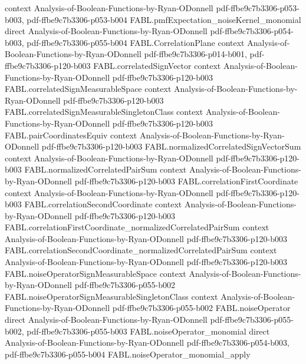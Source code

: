 \begin{theorem}
  {context}
  {Analysis-of-Boolean-Functions-by-Ryan-ODonnell}
  {pdf-ffbe9c7b3306-p053-b003,
    pdf-ffbe9c7b3306-p053-b004}
\proofstep
  {FABL.pmfExpectation_noiseKernel_monomial}
  {direct}
  {Analysis-of-Boolean-Functions-by-Ryan-ODonnell}
  {pdf-ffbe9c7b3306-p054-b003,
    pdf-ffbe9c7b3306-p055-b004}
\proofstep
  {FABL.CorrelationPlane}
  {context}
  {Analysis-of-Boolean-Functions-by-Ryan-ODonnell}
  {pdf-ffbe9c7b3306-p014-b001,
    pdf-ffbe9c7b3306-p120-b003}
\proofstep
  {FABL.correlatedSignVector}
  {context}
  {Analysis-of-Boolean-Functions-by-Ryan-ODonnell}
  {pdf-ffbe9c7b3306-p120-b003}
\proofstep
  {FABL.correlatedSignMeasurableSpace}
  {context}
  {Analysis-of-Boolean-Functions-by-Ryan-ODonnell}
  {pdf-ffbe9c7b3306-p120-b003}
\proofstep
  {FABL.correlatedSignMeasurableSingletonClass}
  {context}
  {Analysis-of-Boolean-Functions-by-Ryan-ODonnell}
  {pdf-ffbe9c7b3306-p120-b003}
\proofstep
  {FABL.pairCoordinatesEquiv}
  {context}
  {Analysis-of-Boolean-Functions-by-Ryan-ODonnell}
  {pdf-ffbe9c7b3306-p120-b003}
\proofstep
  {FABL.normalizedCorrelatedSignVectorSum}
  {context}
  {Analysis-of-Boolean-Functions-by-Ryan-ODonnell}
  {pdf-ffbe9c7b3306-p120-b003}
\proofstep
  {FABL.normalizedCorrelatedPairSum}
  {context}
  {Analysis-of-Boolean-Functions-by-Ryan-ODonnell}
  {pdf-ffbe9c7b3306-p120-b003}
\proofstep
  {FABL.correlationFirstCoordinate}
  {context}
  {Analysis-of-Boolean-Functions-by-Ryan-ODonnell}
  {pdf-ffbe9c7b3306-p120-b003}
\proofstep
  {FABL.correlationSecondCoordinate}
  {context}
  {Analysis-of-Boolean-Functions-by-Ryan-ODonnell}
  {pdf-ffbe9c7b3306-p120-b003}
\proofstep
  {FABL.correlationFirstCoordinate_normalizedCorrelatedPairSum}
  {context}
  {Analysis-of-Boolean-Functions-by-Ryan-ODonnell}
  {pdf-ffbe9c7b3306-p120-b003}
\proofstep
  {FABL.correlationSecondCoordinate_normalizedCorrelatedPairSum}
  {context}
  {Analysis-of-Boolean-Functions-by-Ryan-ODonnell}
  {pdf-ffbe9c7b3306-p120-b003}
\proofstep
  {FABL.noiseOperatorSignMeasurableSpace}
  {context}
  {Analysis-of-Boolean-Functions-by-Ryan-ODonnell}
  {pdf-ffbe9c7b3306-p055-b002}
\proofstep
  {FABL.noiseOperatorSignMeasurableSingletonClass}
  {context}
  {Analysis-of-Boolean-Functions-by-Ryan-ODonnell}
  {pdf-ffbe9c7b3306-p055-b002}
\proofstep
  {FABL.noiseOperator}
  {direct}
  {Analysis-of-Boolean-Functions-by-Ryan-ODonnell}
  {pdf-ffbe9c7b3306-p055-b002,
    pdf-ffbe9c7b3306-p055-b003}
\proofstep
  {FABL.noiseOperator_monomial}
  {direct}
  {Analysis-of-Boolean-Functions-by-Ryan-ODonnell}
  {pdf-ffbe9c7b3306-p054-b003,
    pdf-ffbe9c7b3306-p055-b004}
\proofstep
  {FABL.noiseOperator_monomial_apply}

\end{theorem}
